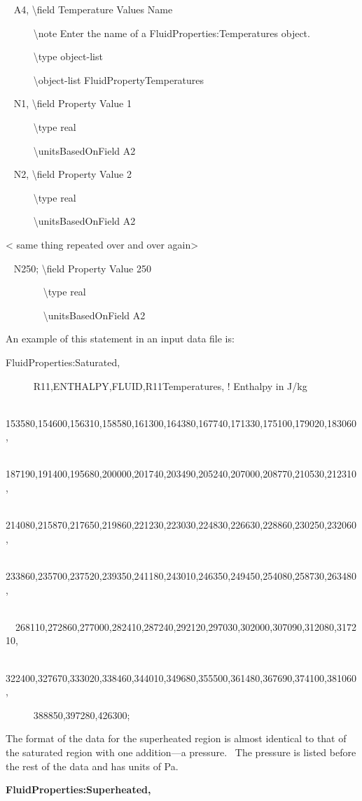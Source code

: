 ~ A4, \textbackslash{}field Temperature Values Name

~~~~~ \textbackslash{}note Enter the name of a FluidProperties:Temperatures object.

~~~~~ \textbackslash{}type object-list

~~~~~ \textbackslash{}object-list FluidPropertyTemperatures

~ N1, \textbackslash{}field Property Value 1

~~~~~ \textbackslash{}type real

~~~~~ \textbackslash{}unitsBasedOnField A2

~ N2, \textbackslash{}field Property Value 2

~~~~~ \textbackslash{}type real

~~~~~ \textbackslash{}unitsBasedOnField A2

\textless{} same thing repeated over and over again\textgreater{}

~ N250; \textbackslash{}field Property Value 250

~~~~~~~ \textbackslash{}type real

~~~~~~~ \textbackslash{}unitsBasedOnField A2

An example of this statement in an input data file is:

FluidProperties:Saturated,

~~~~~ R11,ENTHALPY,FLUID,R11Temperatures, ! Enthalpy in J/kg

~~~~~ 153580,154600,156310,158580,161300,164380,167740,171330,175100,179020,183060,

~~~~~ 187190,191400,195680,200000,201740,203490,205240,207000,208770,210530,212310,

~~~~~ 214080,215870,217650,219860,221230,223030,224830,226630,228860,230250,232060,

~~~~~ 233860,235700,237520,239350,241180,243010,246350,249450,254080,258730,263480,

~~~ ~~268110,272860,277000,282410,287240,292120,297030,302000,307090,312080,317210,

~~~~~ 322400,327670,333020,338460,344010,349680,355500,361480,367690,374100,381060,

~~~~~ 388850,397280,426300;

The format of the data for the superheated region is almost identical to that of the saturated region with one addition---a pressure.~ The pressure is listed before the rest of the data and has units of Pa.

\textbf{FluidProperties:Superheated,}

